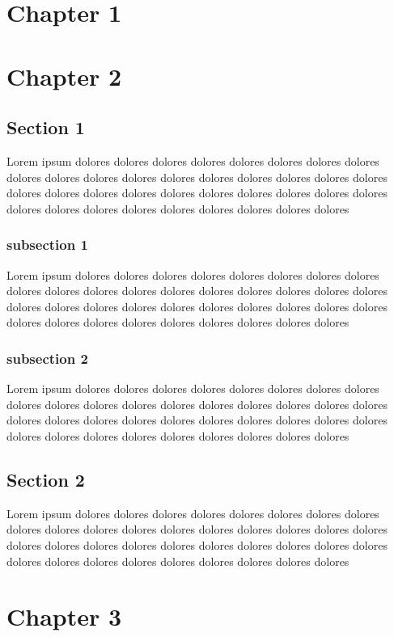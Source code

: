 \chapter{Chapter 1}
\label{chap:included}

\chapter{Chapter 2}
\label{chap:sibling}

\section{Section 1}
\label{sec:section}

Lorem ipsum dolores dolores dolores dolores dolores dolores dolores dolores dolores dolores dolores dolores dolores dolores dolores dolores dolores dolores dolores dolores dolores dolores dolores dolores dolores dolores dolores dolores dolores dolores dolores dolores dolores dolores dolores dolores dolores 

\subsection{subsection 1}
\label{subsec:subsection}
Lorem ipsum dolores dolores dolores dolores dolores dolores dolores dolores dolores dolores dolores dolores dolores dolores dolores dolores dolores dolores dolores dolores dolores dolores dolores dolores dolores dolores dolores dolores dolores dolores dolores dolores dolores dolores dolores dolores dolores 

\subsection{subsection 2}
\label{subsec:sibling-subsection}
Lorem ipsum dolores dolores dolores dolores dolores dolores dolores dolores dolores dolores dolores dolores dolores dolores dolores dolores dolores dolores dolores dolores dolores dolores dolores dolores dolores dolores dolores dolores dolores dolores dolores dolores dolores dolores dolores dolores dolores 

\section{Section 2}
\label{sec:another}
Lorem ipsum dolores dolores dolores dolores dolores dolores dolores dolores dolores dolores dolores dolores dolores dolores dolores dolores dolores dolores dolores dolores dolores dolores dolores dolores dolores dolores dolores dolores dolores dolores dolores dolores dolores dolores dolores dolores dolores 

\chapter{Chapter 3}
\label{chap:othersibling}